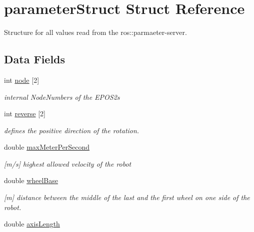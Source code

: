 \hypertarget{structparameterStruct}{\section{parameter\-Struct Struct Reference}
\label{structparameterStruct}
}


Structure for all values read from the ros\-::parmaeter-\/server.  


\subsection*{Data Fields}
\begin{DoxyCompactItemize}
\item 
\hypertarget{structparameterStruct_a8b79a2ace446a6d9aa4ac314b02f6506}{int \hyperlink{structparameterStruct_a8b79a2ace446a6d9aa4ac314b02f6506}{node} \mbox{[}2\mbox{]}}\label{structparameterStruct_a8b79a2ace446a6d9aa4ac314b02f6506}

\begin{DoxyCompactList}\small\item\em internal Node\-Numbers of the E\-P\-O\-S2s \end{DoxyCompactList}\item 
int \hyperlink{structparameterStruct_ab17c626ad31a539fcc209bab7a1eb58f}{reverse} \mbox{[}2\mbox{]}
\begin{DoxyCompactList}\small\item\em defines the positive direction of the rotation. \end{DoxyCompactList}\item 
\hypertarget{structparameterStruct_ac07338a2130f2361513289245146dfe0}{double \hyperlink{structparameterStruct_ac07338a2130f2361513289245146dfe0}{max\-Meter\-Per\-Second}}\label{structparameterStruct_ac07338a2130f2361513289245146dfe0}

\begin{DoxyCompactList}\small\item\em \mbox{[}m/s\mbox{]} highest allowed velocity of the robot \end{DoxyCompactList}\item 
double \hyperlink{structparameterStruct_acf8bcc9f3ae045e1618bf779f151305f}{wheel\-Base}
\begin{DoxyCompactList}\small\item\em \mbox{[}m\mbox{]} distance between the middle of the last and the first wheel on one side of the robot. \end{DoxyCompactList}\item 
\hypertarget{structparameterStruct_a03d7ba511174783dee702ee4279a3481}{double \hyperlink{structparameterStruct_a03d7ba511174783dee702ee4279a3481}{axis\-Length}}\label{structparameterStruct_a03d7ba511174783dee702ee4279a3481}


\end{DoxyCompactItemize}
